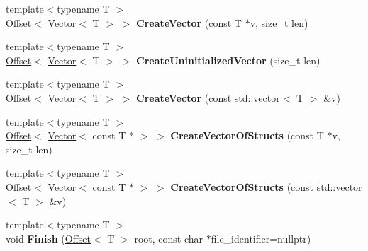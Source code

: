 \begin{DoxyCompactItemize}
\item 
\mbox{\label{classflatbuffers_1_1FlatBufferBuilder_a2cca5c89246a53e80e6ad9487f4c36f3}} 
{\footnotesize template$<$typename T $>$ }\\\hyperlink{structflatbuffers_1_1Offset}{Offset}$<$ \hyperlink{classflatbuffers_1_1Vector}{Vector}$<$ T $>$ $>$ {\bfseries Create\+Vector} (const T $\ast$v, size\+\_\+t len)
\item 
\mbox{\label{classflatbuffers_1_1FlatBufferBuilder_ac85de2e957af13fc3a1651f1f0491952}} 
{\footnotesize template$<$typename T $>$ }\\\hyperlink{structflatbuffers_1_1Offset}{Offset}$<$ \hyperlink{classflatbuffers_1_1Vector}{Vector}$<$ T $>$ $>$ {\bfseries Create\+Uninitialized\+Vector} (size\+\_\+t len)
\item 
\mbox{\label{classflatbuffers_1_1FlatBufferBuilder_af715dd24dd37cb0151dc7a980ad0f207}} 
{\footnotesize template$<$typename T $>$ }\\\hyperlink{structflatbuffers_1_1Offset}{Offset}$<$ \hyperlink{classflatbuffers_1_1Vector}{Vector}$<$ T $>$ $>$ {\bfseries Create\+Vector} (const std\+::vector$<$ T $>$ \&v)
\item 
\mbox{\label{classflatbuffers_1_1FlatBufferBuilder_afede51fd9c32d146cbb1832f57c5e1b7}} 
{\footnotesize template$<$typename T $>$ }\\\hyperlink{structflatbuffers_1_1Offset}{Offset}$<$ \hyperlink{classflatbuffers_1_1Vector}{Vector}$<$ const T $\ast$ $>$ $>$ {\bfseries Create\+Vector\+Of\+Structs} (const T $\ast$v, size\+\_\+t len)
\item 
\mbox{\label{classflatbuffers_1_1FlatBufferBuilder_a8704709a2e25ad04679212ee4126b1a1}} 
{\footnotesize template$<$typename T $>$ }\\\hyperlink{structflatbuffers_1_1Offset}{Offset}$<$ \hyperlink{classflatbuffers_1_1Vector}{Vector}$<$ const T $\ast$ $>$ $>$ {\bfseries Create\+Vector\+Of\+Structs} (const std\+::vector$<$ T $>$ \&v)
\item 
\mbox{\label{classflatbuffers_1_1FlatBufferBuilder_a0c9e507b373d598b51052fab4fa34912}} 
{\footnotesize template$<$typename T $>$ }\\void {\bfseries Finish} (\hyperlink{structflatbuffers_1_1Offset}{Offset}$<$ T $>$ root, const char $\ast$file\+\_\+identifier=nullptr)
\end{DoxyCompactItemize}
